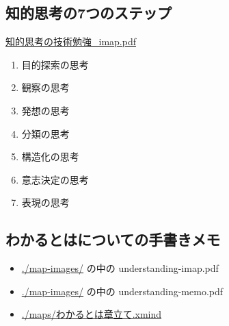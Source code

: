 \documentclass[dvipdfmx,11pat]{jarticle}
\begin{document}
\subsection{知的思考の7つのステップ}
\label{sec:org515d555}
\href{https://masayuki054.github.io/tools\_for\_thinking\_and\_memo/i\_maps/\%E7\%9F\%A5\%E7\%9A\%84\%E6\%80\%9D\%E8\%80\%83\%E3\%81\%AE\%E6\%8A\%80\%E8\%A1\%93\%E5\%8B\%89\%E5\%BC\%B7\_imap.pdf}{知的思考の技術勉強\_imap.pdf}
\begin{enumerate}
\item 目的探索の思考
\item 観察の思考
\item 発想の思考
\item 分類の思考
\item 構造化の思考
\item 意志決定の思考
\item 表現の思考
\end{enumerate}
\subsection{わかるとはについての手書きメモ}
\label{sec:orga60ce41}
\begin{itemize}
\item \url{./map-images/} の中の understanding-imap.pdf
\item \url{./map-images/} の中の understanding-memo.pdf
\item \url{./maps/わかるとは章立て.xmind}
\end{itemize}
\end{document}
